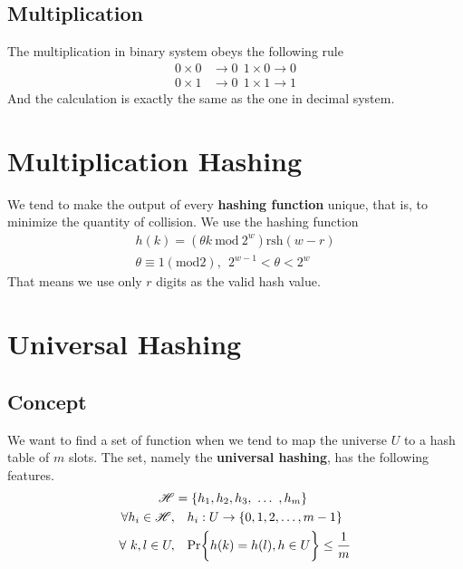 \documentclass[15pt]{article}
\begin{document}
\subsection{Multiplication}
The multiplication in binary system obeys the following rule
\begin{equation}
\begin{aligned}
    0\times0 &\rightarrow 0~~1\times0\rightarrow 0\\
    0\times1&\rightarrow0~~1\times1\rightarrow1
\end{aligned}
\end{equation}
And the calculation is exactly the same as the one in decimal system.
\section{Multiplication Hashing}
We tend to make the output of every \textbf{hashing function} unique, that is, to minimize the quantity of collision. We use the hashing function
\begin{equation}
\begin{aligned}
    h(k) = (\theta k~\text{mod} ~2^w ) \text{rsh}(w-r) \\
    \theta \equiv 1(\text{mod}2),~~2^{w-1} < \theta < 2^w
\end{aligned}
\end{equation}
That means we use only $r$ digits as the valid hash value.
\section{Universal Hashing}
\subsection{Concept}
We want to find a set of function when we tend to map the universe $U$ to a hash table of $m$ slots. The set, namely the \textbf{universal hashing}, has the following features.
\begin{equation}
\begin{aligned}
    \mathscr{H} &= \{h_1, h_2, h_3,~\dots~, h_m\} \\
    \forall h_i \in \mathscr{H},&~~~h_i: U \rightarrow \{0, 1, 2, \dots, m-1\} \\
    \forall~k, l \in U,&~~~\text{Pr}\bigg\{ h(k) = h(l), h \in U \bigg\} \leq \frac{1}{m} \notag
\end{aligned}
\end{equation}
\end{document}
